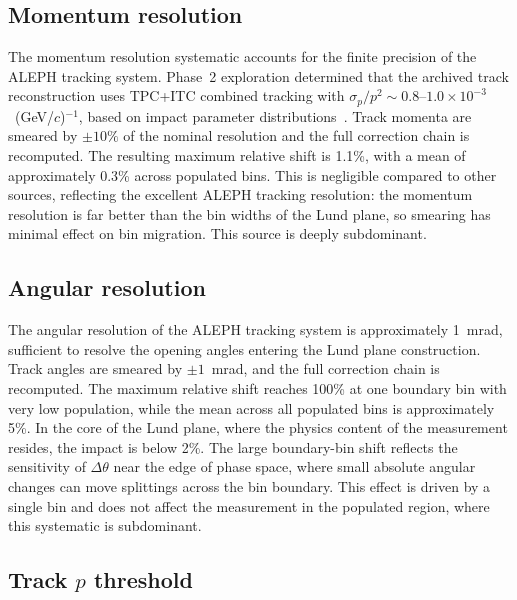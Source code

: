 \documentclass[11pt,a4paper]{article}
\begin{document}
\subsection{Momentum resolution}
\label{sec:syst-momentum}

The momentum resolution systematic accounts for the finite precision
of the ALEPH tracking system.  Phase~2 exploration determined that
the archived track reconstruction uses TPC+ITC combined tracking
with $\sigma_p / p^2 \sim 0.8$--$1.0 \times 10^{-3}$~(GeV/$c$)$^{-1}$,
based on impact parameter distributions~\cite{ALEPH:1995aqm}.
Track momenta are smeared by $\pm 10\%$ of the nominal resolution and the
full correction chain is recomputed.  The resulting maximum relative shift
is 1.1\%, with a mean of approximately 0.3\% across populated bins.  This
is negligible compared to other sources, reflecting the excellent ALEPH
tracking resolution: the momentum resolution is far better than the bin
widths of the Lund plane, so smearing has minimal effect on bin migration.
This source is deeply subdominant.

\subsection{Angular resolution}
\label{sec:syst-angular}

The angular resolution of the ALEPH tracking system is approximately
1~mrad, sufficient to resolve the opening angles entering the Lund
plane construction.  Track angles are smeared by $\pm 1$~mrad, and the
full correction chain is recomputed.  The maximum relative shift reaches
100\% at one boundary bin with very low population, while the mean across
all populated bins is approximately 5\%.  In the core of the Lund plane,
where the physics content of the measurement resides, the impact is
below 2\%.  The large boundary-bin shift reflects the sensitivity of
$\Delta\theta$ near the edge of phase space, where small absolute
angular changes can move splittings across the bin boundary.  This
effect is driven by a single bin and does not affect the measurement
in the populated region, where this systematic is subdominant.

\subsection{Track $p$ threshold}
\label{sec:syst-p-threshold}
\end{document}
